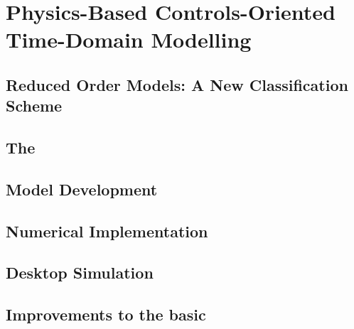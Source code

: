 
\chapter{Physics-Based Controls-Oriented Time-Domain Modelling}

\graphicspath{{4/figures/}}

\section{Reduced Order Models: A New Classification Scheme}\label{sec:classificationscheme}


\section{The }\label{sec:spmintro}


\section{ Model Development}\label{sec:spmmodeldevelopment}


\section{Numerical Implementation}\label{sec:numericalimplementation}


\section{Desktop Simulation}\label{sec:basicspmsimresults}


\section{Improvements to the basic }\label{sec:spmimprovements}


